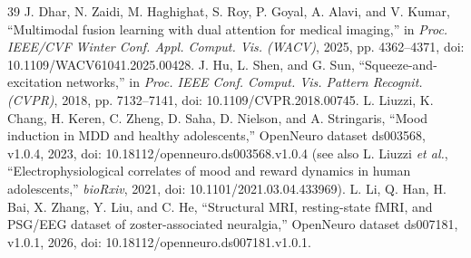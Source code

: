 \begin{thebibliography}{39}
J. Dhar, N. Zaidi, M. Haghighat, S. Roy, P. Goyal, A. Alavi, and V. Kumar, ``Multimodal fusion learning with dual attention for medical imaging,'' in \emph{Proc. IEEE/CVF Winter Conf. Appl. Comput. Vis. (WACV)}, 2025, pp. 4362--4371, doi: 10.1109/WACV61041.2025.00428.
J. Hu, L. Shen, and G. Sun, ``Squeeze-and-excitation networks,'' in \emph{Proc. IEEE Conf. Comput. Vis. Pattern Recognit. (CVPR)}, 2018, pp. 7132--7141, doi: 10.1109/CVPR.2018.00745.
L. Liuzzi, K. Chang, H. Keren, C. Zheng, D. Saha, D. Nielson, and A. Stringaris, ``Mood induction in MDD and healthy adolescents,'' OpenNeuro dataset ds003568, v1.0.4, 2023, doi: 10.18112/openneuro.ds003568.v1.0.4 (see also L. Liuzzi \emph{et al.}, ``Electrophysiological correlates of mood and reward dynamics in human adolescents,'' \emph{bioRxiv}, 2021, doi: 10.1101/2021.03.04.433969).
L. Li, Q. Han, H. Bai, X. Zhang, Y. Liu, and C. He, ``Structural MRI, resting-state fMRI, and PSG/EEG dataset of zoster-associated neuralgia,'' OpenNeuro dataset ds007181, v1.0.1, 2026, doi: 10.18112/openneuro.ds007181.v1.0.1.
\end{thebibliography}
